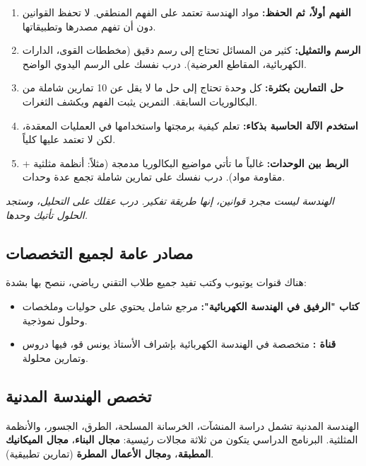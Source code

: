 \documentclass[12pt,a4paper]{book}
\newcommand{\quoteAr}[1]{%
	\begin{myquote}
		\itshape #1
	\end{myquote}
}
\begin{document}
\begin{enumerate}
	\item \textbf{الفهم أولاً، ثم الحفظ:} مواد الهندسة تعتمد على الفهم المنطقي. لا تحفظ القوانين دون أن تفهم مصدرها وتطبيقاتها.
	\item \textbf{الرسم والتمثيل:} كثير من المسائل تحتاج إلى رسم دقيق (مخططات القوى، الدارات الكهربائية، المقاطع العرضية). درب نفسك على الرسم اليدوي الواضح.
	\item \textbf{حل التمارين بكثرة:} كل وحدة تحتاج إلى حل ما لا يقل عن 10 تمارين شاملة من البكالوريات السابقة. التمرين يثبت الفهم ويكشف الثغرات.
	\item \textbf{استخدم الآلة الحاسبة بذكاء:} تعلم كيفية برمجتها واستخدامها في العمليات المعقدة، لكن لا تعتمد عليها كلياً.
	\item \textbf{الربط بين الوحدات:} غالباً ما تأتي مواضيع البكالوريا مدمجة (مثلاً: أنظمة مثلثية + مقاومة مواد). درب نفسك على تمارين شاملة تجمع عدة وحدات.
\end{enumerate}

\quoteAr{الهندسة ليست مجرد قوانين، إنها طريقة تفكير. درب عقلك على التحليل، وستجد الحلول تأتيك وحدها.}

\subsection{مصادر عامة لجميع التخصصات}

هناك قنوات يوتيوب وكتب تفيد جميع طلاب التقني رياضي، ننصح بها بشدة:

\begin{itemize}
	\item \textbf{كتاب "الرفيق في الهندسة الكهربائية":} مرجع شامل يحتوي على حوليات وملخصات وحلول نموذجية.
	\item \textbf{قناة :} متخصصة في الهندسة الكهربائية بإشراف الأستاذ يونس قو، فيها دروس وتمارين محلولة.
\end{itemize}

\subsection{تخصص الهندسة المدنية}

الهندسة المدنية تشمل دراسة المنشآت، الخرسانة المسلحة، الطرق، الجسور، والأنظمة المثلثية. البرنامج الدراسي يتكون من ثلاثة مجالات رئيسية: \textbf{مجال البناء}، \textbf{مجال الميكانيك المطبقة}، و\textbf{مجال الأعمال المطرة} (تمارين تطبيقية).
\end{document}
